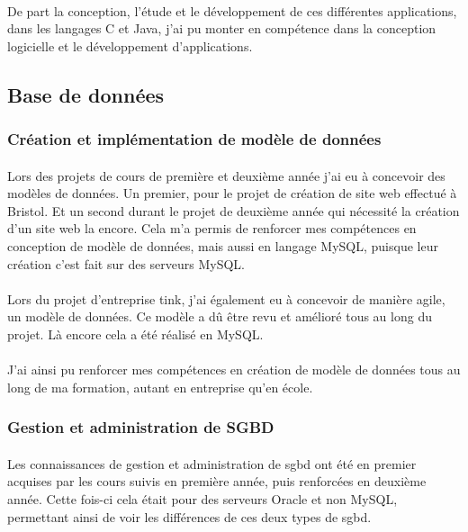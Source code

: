 \documentclass[12pt,a4paper]{report}
\begin{document}
\paragraph*{}De part la conception, l’étude et le développement de ces différentes applications, dans les langages C et Java, j’ai pu monter en compétence dans la conception logicielle et le développement d’applications.\\

\subsection{Base de données}
\subsubsection{Création et implémentation de modèle de données}
\paragraph*{}Lors des projets de cours de première et deuxième année j'ai eu à concevoir des modèles de données. Un premier, pour le projet de création de site web effectué à Bristol. Et un second durant le projet de deuxième année qui nécessité la création d'un site web la encore. Cela m'a permis de renforcer mes compétences en conception de modèle de données, mais aussi en langage MySQL, puisque leur création c'est fait sur des serveurs MySQL.
\paragraph*{}Lors du projet d'entreprise \gls{tink}, j'ai également eu à concevoir de manière agile, un modèle de données. Ce modèle a dû être revu et amélioré tous au long du projet. Là encore cela a été réalisé en MySQL.
\paragraph*{}J'ai ainsi pu renforcer mes compétences en création de modèle de données tous au long de ma formation, autant en entreprise qu'en école. \\
\subsubsection{Gestion et administration de SGBD}
\paragraph*{}Les connaissances de gestion et administration de \gls{sgbd} ont été en premier acquises par les cours suivis en première année, puis renforcées en deuxième année. Cette fois-ci cela était pour des serveurs Oracle et non MySQL, permettant ainsi de voir les différences de ces deux types de \gls{sgbd}.
\end{document}
